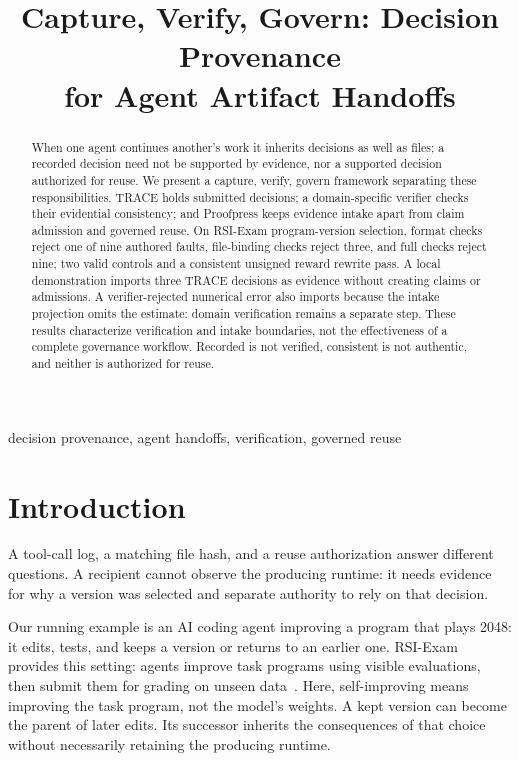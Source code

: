 \documentclass[conference]{IEEEtran}
\title{Capture, Verify, Govern: Decision Provenance\\for Agent Artifact Handoffs}
\author{\IEEEauthorblockN{Anonymous Authors}}
\begin{document}
\maketitle
\begin{abstract}
When one agent continues another's work it inherits decisions as well as files; a recorded decision need not be supported by evidence, nor a supported decision authorized for reuse. We present a capture, verify, govern framework separating these responsibilities. TRACE holds submitted decisions; a domain-specific verifier checks their evidential consistency; and Proofpress keeps evidence intake apart from claim admission and governed reuse. On RSI-Exam program-version selection, format checks reject one of nine authored faults, file-binding checks reject three, and full checks reject nine; two valid controls and a consistent unsigned reward rewrite pass. A local demonstration imports three TRACE decisions as evidence without creating claims or admissions. A verifier-rejected numerical error also imports because the intake projection omits the estimate: domain verification remains a separate step. These results characterize verification and intake boundaries, not the effectiveness of a complete governance workflow. Recorded is not verified, consistent is not authentic, and neither is authorized for reuse.
\end{abstract}
\begin{IEEEkeywords}
decision provenance, agent handoffs, verification, governed reuse
\end{IEEEkeywords}

\section{Introduction}
A tool-call log, a matching file hash, and a reuse authorization answer different questions. A recipient cannot observe the producing runtime: it needs evidence for why a version was selected and separate authority to rely on that decision.

Our running example is an AI coding agent improving a program that plays 2048: it edits, tests, and keeps a version or returns to an earlier one. RSI-Exam provides this setting: agents improve task programs using visible evaluations, then submit them for grading on unseen data~\cite{rsiexam}. Here, self-improving means improving the task program, not the model's weights. A kept version can become the parent of later edits. Its successor inherits the consequences of that choice without necessarily retaining the producing runtime.
\end{document}

